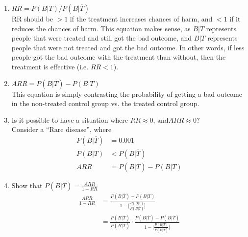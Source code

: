 \documentclass{article}
\begin{document}
\begin{enumerate}[label=\alph*)]
    \item \(RR = P(B \vert T) / P(B \vert \overline{T})\) \\
    RR should be \(> 1\) if the treatment increases chances of harm, and \(< 1\) if it reduces the chances of harm.
    This equation makes sense, as \(B | T\) represents people that were treated and still got the bad outcome, and \(B | \overline{T}\) represents people that were not treated and got the bad outcome.
    In other words, if less people got the bad outcome with the treatment than without, then the treatment is effective (i.e. \(RR < 1\)).
    \item \(ARR = P(B \vert \overline{T}) - P(B \vert T)\) \\
    This equation is simply contrasting the probability of getting a bad outcome in the non-treated control group vs. the treated control group.
    \item Is it possible to have a situation where \(RR \approx 0 \text{, and} ARR \approx 0\)? \\
    Consider a ``Rare disease'', where
    \begin{align*}
        P(B \vert \overline{T}) &= 0.001 \\
        P(B \vert T) &< P(B \vert \overline{T}) \\
        ARR &= P(B \vert \overline{T}) - P(B \vert T)
    \end{align*}
    \item Show that \(P(B \vert \overline{T}) = \frac{ARR}{1-RR}\)
    \begin{align*}
        \frac{
            ARR
        }{
            1-RR
        } &= 
        \frac{
            P(B \vert \overline{T}) - P(B \vert T)
        }
        {
            1 - \lbrack 
                \frac{
                    P (B \vert T)
                }{
                    P(B \vert \overline{T})
                } \rbrack
        } \\
        &=
        \frac{
            P(B \vert \overline{T})
        }
        {
            P(B \vert \overline{T})
        } \cdot
        \frac{
            P(B \vert \overline{T}) - P(B \vert \overline{T})
        }
        {
            1 - \lbrack \frac{
                P (B \vert T)
                }
                {
                    P (B \vert \overline{T})
                } \rbrack
        }
    \end{align*}
\end{enumerate}
\end{document}

